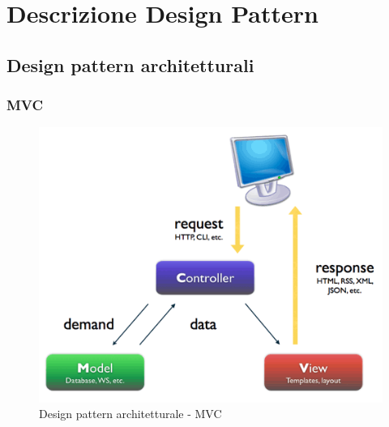 %
%




\section{Descrizione Design Pattern} %
\label{sec:descdp}
	\subsection{Design pattern architetturali} %

		\subsubsection{MVC} %

		\begin{figure}[htbp]
			\centering
			\centerline{\includegraphics[scale=0.6]{./images/mvc.png}}
			\caption{Design pattern architetturale - MVC}
		\end{figure}

